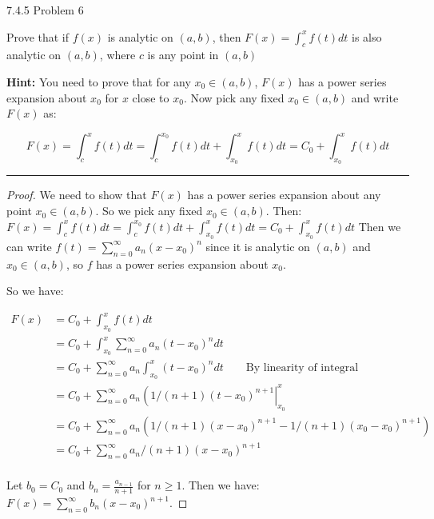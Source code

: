\documentclass[11pt]{article}
\begin{document}
 7.4.5 Problem 6

Prove that if $f(x)$ is analytic on $(a,b)$, then $F(x) = \int_c ^x f(t)dt$ 
is also analytic on $(a,b)$, where $c$ is any point in $(a,b)$

\textbf{Hint:} You need to prove that for any $x_0 \in (a,b)$, $F(x)$ has
a power series expansion about $x_0$ for $x$ close to $x_0$.
Now pick any fixed $x_0 \in (a,b)$ and write $F(x)$ as:

$$F(x) = \int_c ^x f(t) dt = \int_c ^{x_0} f(t) dt + \int_{x_0} ^x f(t) dt = C_0 + \int_{x_0} ^x f(t)dt$$

\hrule

\begin{proof}
    
    We need to show that $F(x)$ has a power series expansion about any point $x_0 \in (a,b)$.
    So we pick any fixed $x_0 \in (a,b)$.
    Then: $F(x) = \int_c ^x f(t) dt = \int_c ^{x_0} f(t) dt + \int_{x_0} ^x f(t) dt = C_0 + \int_{x_0} ^x f(t)dt$
    Then we can write $f(t) = \sum_{n=0} ^\infty a_n (x-x_0)^n$
    since it is analytic on $(a,b)$ and $x_0 \in (a,b)$, so $f$ has a power series expansion about $x_0$.

    So we have:

    \begin{align*}
        F(x) &= C_0 + \int_{x_0} ^x f(t)dt\\
        &= C_0 + \int_{x_0} ^x \sum_{n=0} ^\infty a_n (t-x_0)^n dt\\
        &= C_0 + \sum_{n=0} ^\infty a_n \int_{x_0} ^x  (t-x_0)^n dt \quad \quad \text{By linearity of integral}\\
        &= C_0 + \sum_{n=0} ^\infty  a_n \left(  1/(n+1) (t-x_0)^{n+1} \right| _{x_0}^x\\
        &= C_0 + \sum_{n=0} ^\infty  a_n \left(  1/(n+1) (x-x_0)^{n+1} - 1/(n+1) (x_0-x_0)^{n+1}\right)\\
        &= C_0 + \sum_{n=0} ^\infty  a_n/(n+1) (x-x_0)^{n+1}\\
    \end{align*}

    Let $b_0 = C_0$ and $b_n = \frac{a_{n-1}}{n+1}$ for $n \geq 1$. Then we have:
    $F(x) = \sum_{n=0} ^\infty b_n (x-x_0)^{n+1}$. 



\end{proof}
\end{document}
